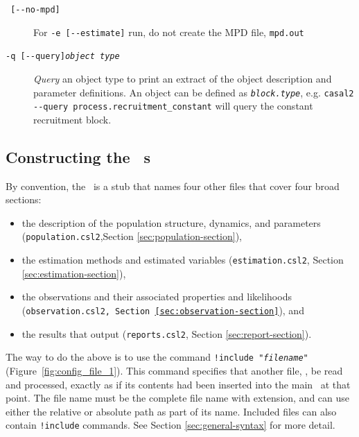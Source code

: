 \begin{description}
\item [\texttt{   [-{}-no-mpd] }] For \texttt{-e [-{}-estimate]} run, do not create the MPD file, \texttt{mpd.out}

\item [\texttt{-q [-{}-query]\emph{object type}}] \emph{Query} an object type to print an extract of the object description and parameter definitions.  An object can be defined as \texttt{\emph{block.type}}, e.g. \texttt{casal2 -{}-query process.recruitment\_constant} will query the constant recruitment block.

\end{description}

\subsection{Constructing the \CNAME\ \config s \label{constructing-config}}

By convention, the \config\ is a stub that names four other files that cover four broad sections:

\begin{itemize}
	\item the description of the population structure, dynamics, and parameters (\texttt{population.csl2},Section \ref{sec:population-section}),
	\item the estimation methods and estimated variables (\texttt{estimation.csl2}, Section \ref{sec:estimation-section}),
	\item the observations and their associated properties and likelihoods (\texttt{observation.csl2, Section \ref{sec:observation-section}}), and
	\item the results that \CNAME\will output (\texttt{reports.csl2}, Section \ref{sec:report-section}).
\end{itemize}

The way to do the above is to use the command \texttt{!include "\emph{filename}"} (Figure~\ref{fig:config_file_1}). This command specifies that another file, , be read and processed, exactly as if its contents had been inserted into the main \config~at that point. The file name must be the complete file name with extension, and can use either the relative or absolute path as part of its name. Included files can also contain \texttt{!include} commands. See Section \ref{sec:general-syntax} for more detail.


